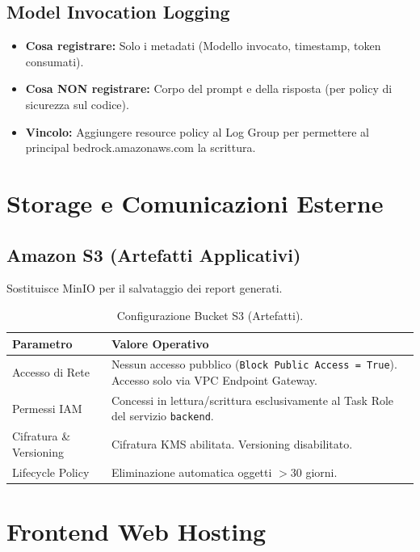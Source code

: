 \documentclass[11pt,a4paper]{article}
\begin{document}
\subsection{Model Invocation Logging}

\begin{itemize}
    \item \textbf{Cosa registrare:} Solo i metadati (Modello invocato, timestamp, token consumati).
    \item \textbf{Cosa NON registrare:} Corpo del prompt e della risposta (per policy di sicurezza sul codice).
    \item \textbf{Vincolo:} Aggiungere resource policy al Log Group per permettere al principal {\ttfamily bedrock.\allowbreak{}amazonaws.com} la scrittura.
\end{itemize}

\section{Storage e Comunicazioni Esterne}

\subsection{Amazon S3 (Artefatti Applicativi)}

Sostituisce MinIO per il salvataggio dei report generati.

\begin{table}[H]
\centering
\caption{Configurazione Bucket S3 (Artefatti).}
\label{tab:aws-s3-artefatti}
\vspace{2mm}
\renewcommand{\arraystretch}{1.2}
\begin{tabularx}{\textwidth}{|l|X|}
\hline
\textbf{Parametro} & \textbf{Valore Operativo} \\ \hline
Accesso di Rete & Nessun accesso pubblico (\texttt{Block Public Access = True}). Accesso solo via VPC Endpoint Gateway. \\ \hline
Permessi IAM & Concessi in lettura/scrittura esclusivamente al Task Role del servizio \texttt{backend}. \\ \hline
Cifratura \& Versioning & Cifratura KMS abilitata. Versioning disabilitato. \\ \hline
Lifecycle Policy & Eliminazione automatica oggetti $>30$ giorni. \\ \hline
\end{tabularx}
\end{table}

\section{Frontend Web Hosting}
\label{sec:aws-frontend-hosting}
\end{document}
